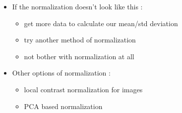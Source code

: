 \documentclass[12pt,a4paper]{article}
\begin{document}
\begin{itemize}
\begin{minipage}{\linewidth}
\begin{figure}[H]
    \hspace{1cm}
  \end{figure}
\end{minipage}
\item If the normalization doesn't look like this :
\begin{itemize}
\item get more data to calculate our mean/std deviation
\item try another method of normalization
\item not bother with normalization at all
\end{itemize}
\item Other options of normalization :
\begin{itemize}
\item local contrast normalization for images
\item PCA based normalization
\end{itemize}
\end{itemize}
\end{document}
